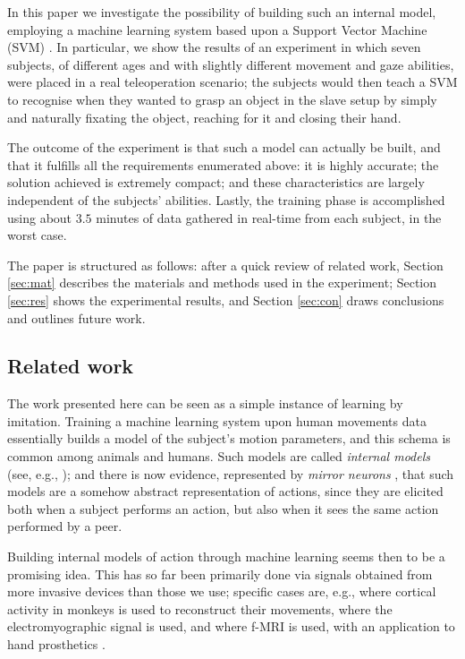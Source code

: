 \documentclass[a4paper,10pt,conference]{ieeeconf}
\begin{document}
In this paper we investigate the possibility of building such an
internal model, employing a machine learning system based upon a
Support Vector Machine (SVM) \cite{BGV92}. In particular, we show the
results of an experiment in which seven subjects, of different ages
and with slightly different movement and gaze abilities, were placed
in a real teleoperation scenario; the subjects would then teach a SVM
to recognise when they wanted to grasp an object in the slave setup by
simply and naturally fixating the object, reaching for it and closing
their hand.

The outcome of the experiment is that such a model can actually be
built, and that it fulfills all the requirements enumerated above: it
is highly accurate; the solution achieved is extremely compact; and
these characteristics are largely independent of the subjects'
abilities. Lastly, the training phase is accomplished using about
$3.5$ minutes of data gathered in real-time from each subject, in the
worst case.

The paper is structured as follows: after a quick review of related
work, Section \ref{sec:mat} describes the materials and methods used
in the experiment; Section \ref{sec:res} shows the experimental
results, and Section \ref{sec:con} draws conclusions and outlines
future work.

\subsection*{Related work}

The work presented here can be seen as a simple instance of learning
by imitation. Training a machine learning system upon human movements
data essentially builds a model of the subject's motion parameters,
and this schema is common among animals and humans. Such models are
called \emph{internal models} (see, e.g.,
\cite{kawato-99,wolpert-03,mussaivaldi-00}); and there is now
evidence, represented by \emph{mirror neurons}
\cite{rizzolatti-04,gallese-96,rizzolatti-01}, that such models are a
somehow abstract representation of actions, since they are elicited
both when a subject performs an action, but also when it sees the same
action performed by a peer.

Building internal models of action through machine learning seems then
to be a promising idea. This has so far been primarily done via
signals obtained from more invasive devices than those we use; specific
cases are, e.g., \cite{black1} where cortical activity in monkeys is
used to reconstruct their movements, \cite{emg} where the
electromyographic signal is used, and \cite{yokoi} where f-MRI is
used, with an application to hand prosthetics \cite{yokoi2}.
\end{document}
